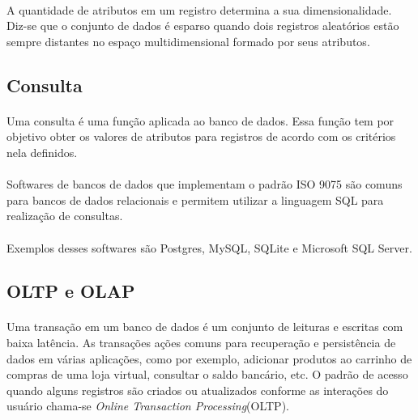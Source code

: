 \paragraph{} A quantidade de atributos em um registro determina a sua dimensionalidade. Diz-se que o conjunto de dados é esparso quando dois registros aleatórios estão sempre distantes no espaço multidimensional formado por seus atributos.

\subsection{Consulta}

\paragraph{} Uma consulta é uma função aplicada ao banco de dados. Essa função tem por objetivo obter os valores de atributos para registros de acordo com os critérios nela definidos.

\paragraph{} Softwares de bancos de dados que implementam o padrão ISO 9075 são comuns para bancos de dados relacionais e permitem utilizar a linguagem SQL para realização de consultas.

\paragraph{} Exemplos desses softwares são Postgres, MySQL, SQLite e Microsoft SQL Server.

\subsection{OLTP e OLAP}

\paragraph{} Uma transação em um banco de dados é um conjunto de leituras e escritas com baixa latência. As transações ações comuns para recuperação e persistência de dados em várias aplicações, como por exemplo, adicionar produtos ao carrinho de compras de uma loja virtual, consultar o saldo bancário, etc. 
O padrão de acesso quando alguns registros são criados ou atualizados conforme as interações do usuário chama-se \textit{Online Transaction Processing}(OLTP).

